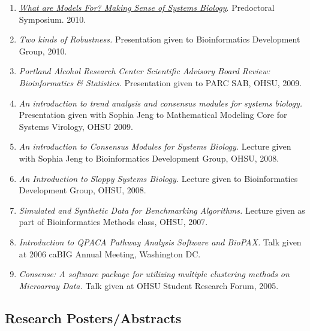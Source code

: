 \documentclass[11pt,]{article}
\begin{document}
\begin{enumerate}
{  Lines.} Invited presentation at Integrative Cancer Biology Program
  retreat, 2011.
\item
  \href{https://www.dropbox.com/s/bi14mo1ahr4yod8/symposium-laderas.pptx?dl=0}{\emph{What
  are Models For? Making Sense of Systems Biology}}. Predoctoral
  Symposium. 2010.
\item
  \emph{Two kinds of Robustness.} Presentation given to Bioinformatics
  Development Group, 2010.
\item
  \emph{Portland Alcohol Research Center Scientific Advisory Board
  Review: Bioinformatics \& Statistics.} Presentation given to PARC SAB,
  OHSU, 2009.
\item
  \emph{An introduction to trend analysis and consensus modules for
  systems biology.} Presentation given with Sophia Jeng to Mathematical
  Modeling Core for Systems Virology, OHSU 2009.
\item
  \emph{An introduction to Consensus Modules for Systems Biology.}
  Lecture given with Sophia Jeng to Bioinformatics Development Group,
  OHSU, 2008.
\item
  \emph{An Introduction to Sloppy Systems Biology.} Lecture given to
  Bioinformatics Development Group, OHSU, 2008.
\item
  \emph{Simulated and Synthetic Data for Benchmarking Algorithms.}
  Lecture given as part of Bioinformatics Methods class, OHSU, 2007.
\item
  \emph{Introduction to QPACA Pathway Analysis Software and BioPAX.}
  Talk given at 2006 caBIG Annual Meeting, Washington DC.
\item
  \emph{Consense: A software package for utilizing multiple clustering
  methods on Microarray Data.} Talk given at OHSU Student Research
  Forum, 2005.
\end{enumerate}

\subsection{Research Posters/Abstracts}\label{research-postersabstracts}
\end{document}
